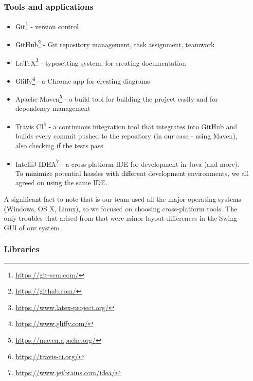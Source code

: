\documentclass[a4paper,12pt]{article}
\begin{document}
\subsubsection*{Tools and applications}

\begin{itemize}
	\item Git\footnote{\url{https://git-scm.com/}} - version control
	\item GitHub\footnote{\url{https://github.com/}} - Git repository management, task assignment, teamwork
	\item \LaTeX\footnote{\url{https://www.latex-project.org/}} - typesetting system, for creating documentation
	\item Gliffy\footnote{\url{https://www.gliffy.com/}} - a Chrome app for creating diagrams
	\item Apache Maven\footnote{\url{https://maven.apache.org/}} - a build tool for building the project easily and for dependency management
	\item Travis CI\footnote{\url{https://travis-ci.org/}} - a continuous integration tool that integrates into GitHub and builds every commit pushed to the repository (in our case - using Maven), also checking if the tests pass
	\item IntelliJ IDEA\footnote{\url{https://www.jetbrains.com/idea/}} - a cross-platform IDE for development in Java (and more). To minimize potential hassles with different development environments, we all agreed on using the same IDE.
\end{itemize}


A significant fact to note that is our team used all the major operating systems (Windows, OS X, Linux), so we focused on choosing cross-platform tools. The only troubles that arised from that were minor layout differences in the Swing GUI of our system.

\subsubsection*{Libraries}
\end{document}
